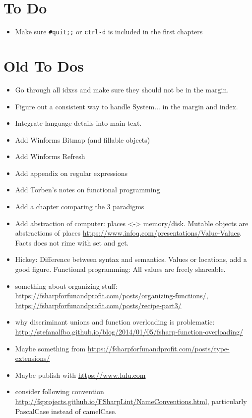 \documentclass[fsharpNotes.tex]{subfiles}
\begin{document}
\chapter{To Do}
\begin{itemize}
\item Make sure \lstinline{#quit;;} or \texttt{ctrl-d} is included in the first chapters
\end{itemize}
\chapter{Old To Dos}
\begin{itemize}
\item Go through all idxss and make sure they should not be in the
  margin.
\item Figure out a consistent way to handle System... in the margin
  and index.
\item Integrate language details into main text.
\item Add Winforms Bitmap (and fillable objects)
\item Add Winforms Refresh
\item Add appendix on regular expressions
\item Add Torben's notes on functional programming
\item Add a chapter comparing the 3 paradigms
\item Add abstraction of computer: places <-> memory/disk. Mutable objects are abstractions of places \url{https://www.infoq.com/presentations/Value-Values}. Facts does not rime with set and get. 
\item Hickey: Difference between syntax and semantics. Values or locations, add a good figure. Functional programming: All values are freely shareable.
\item something about organizing stuff: \url{https://fsharpforfunandprofit.com/posts/organizing-functions/}, \url{https://fsharpforfunandprofit.com/posts/recipe-part3/}
\item why discriminant unions and function overloading is problematic: \url{http://stefanalfbo.github.io/blog/2014/01/05/fsharp-function-overloading/}
\item Maybe something from \url{https://fsharpforfunandprofit.com/posts/type-extensions/}
\item Maybe publish with \url{https://www.lulu.com}
\item consider following convention \url{http://fsprojects.github.io/FSharpLint/NameConventions.html},  particularly PascalCase instead of camelCase.

\end{itemize}
\end{document}
